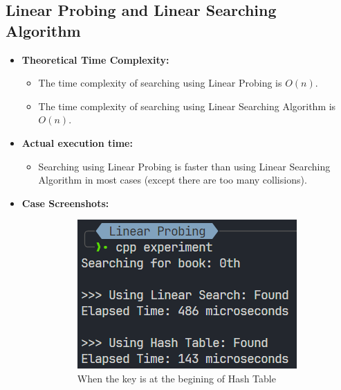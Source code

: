 \subsection{Linear Probing and Linear Searching Algorithm}
\begin{itemize}
	\item \textbf{Theoretical Time Complexity:}
	      \begin{itemize}
		      \item The time complexity of searching using Linear Probing is \(O(n)\).
		      \item The time complexity of searching using Linear Searching Algorithm is \(O(n)\).
	      \end{itemize}
	\item \textbf{Actual execution time:}
	      \begin{itemize}
		      \item Searching using Linear Probing is faster than using Linear Searching Algorithm in most cases (except there are too many collisions).
	      \end{itemize}
	\item \textbf{Case Screenshots:}
	      \begin{figure}[!ht]
		      \centering
		      \begin{subfigure}{0.45\textwidth}
			      \centering
			      \includegraphics[width=\textwidth]{imgs/Linear Probing/beg.png}
			      \caption{When the key is at the begining of Hash Table}\label{fig:linearprobing-beg-metric}
		      \end{subfigure}
		      \hfill
		      \begin{subfigure}{0.45\textwidth}
			      \centering

\end{subfigure}
\end{figure}
\end{itemize}
